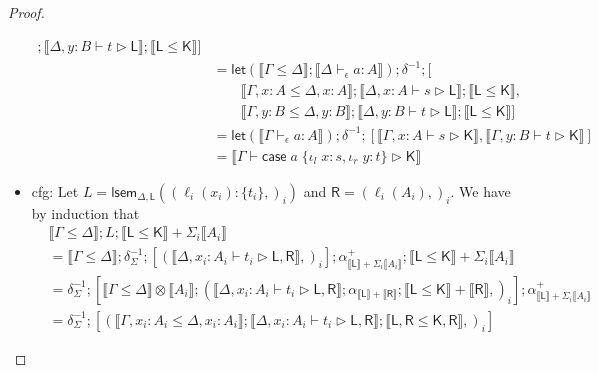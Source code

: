 \documentclass[acmsmall,screen,review]{acmart}
\newcommand{\ms}[1]{\ensuremath{\mathsf{#1}}}
\newcommand{\lto}{:}
\newcommand{\linl}[1]{\iota_l\;{#1}}
\newcommand{\linr}[1]{\iota_r\;{#1}}
\newcommand{\caseexpr}[5]{\ms{case}\;#1\;\{\linl{#2} \lto #3, \linr{#4} \lto #5\}}
\newcommand{\wbranch}[3]{#1(#2) \lto \{#3\}}
\newcommand{\bhyp}[2]{#1 : #2}
\newcommand{\hasty}[4]{#1 \vdash_{#2} #3: {#4}}
\newcommand{\haslb}[3]{#1 \vdash #2 \rhd #3}
\newcommand{\brle}[1]{{\textsf{#1}}}
\newcommand{\dnt}[1]{\llbracket{#1}\rrbracket}
\newcommand{\loopmor}[3]{\ms{lsem}_{#1, #3}(#2)}
\newcommand{\lmor}[1]{\ms{let}(#1)}
\begin{document}
\begin{proof}
\begin{itemize}
\begin{equation}
\begin{aligned}
               ; \dnt{\haslb{\Delta, \bhyp{y}{B}}{t}{\ms{L}}}
               ; \dnt{\ms{L} \leq \ms{K}}
          ] \\
        & = \lmor{\dnt{\Gamma \leq \Delta} ; \dnt{\hasty{\Delta}{\epsilon}{a}{A}}}
           ; \delta^{-1}
           ; [ \\ & \qquad 
              \dnt{\Gamma, \bhyp{x}{A} \leq \Delta, \bhyp{x}{A}}
                ; \dnt{\haslb{\Delta, \bhyp{x}{A}}{s}{\ms{L}}}
                ; \dnt{\ms{L} \leq \ms{K}}, \\ & \qquad
              \dnt{\Gamma, \bhyp{y}{B} \leq \Delta, \bhyp{y}{B}}
                ; \dnt{\haslb{\Delta, \bhyp{y}{B}}{t}{\ms{L}}}
                ; \dnt{\ms{L} \leq \ms{K}}
           ]
            \\
        & = \lmor{\dnt{\hasty{\Gamma}{\epsilon}{a}{A}}}
          ; \delta^{-1}
          ; [ 
            \dnt{\haslb{\Gamma, \bhyp{x}{A}}{s}{\ms{K}}},
            \dnt{\haslb{\Gamma, \bhyp{y}{B}}{t}{\ms{K}}}
          ] \\
        & = \dnt{\haslb{\Gamma}{\caseexpr{a}{x}{s}{y}{t}}{\ms{K}}}
      \end{aligned}
    \end{equation}
    \item \brle{cfg}: Let $L = \loopmor{\Delta}{(\wbranch{\ell_i}{x_i}{t_i},)_i}{\ms{L}}$ and
    $\ms{R} = (\ell_i(A_i),)_i$. We have by induction that
    \begin{equation}
      \begin{aligned}
        & \dnt{\Gamma \leq \Delta} ; L ; \dnt{\ms{L} \leq \ms{K}} + \Sigma_i\dnt{A_i} \\
        & = \dnt{\Gamma \leq \Delta} 
          ; \delta^{-1}_{\Sigma}
          ; [(\dnt{\haslb{\Delta, \bhyp{x_i}{A_i}}{t_i}{\ms{L}, \ms{R}}},)_i]
          ; \alpha^+_{\dnt{\ms{L}} + \Sigma_i\dnt{A_i}}
          ; \dnt{\ms{L} \leq \ms{K}} + \Sigma_i\dnt{A_i} \\
        & = \delta^{-1}_{\Sigma}
          ; [
            \dnt{\Gamma \leq \Delta} \otimes \dnt{A_i}
            ; (\dnt{\haslb{\Delta, \bhyp{x_i}{A_i}}{t_i}{\ms{L}, \ms{R}}}
            ; \alpha_{\dnt{\ms{L}} + \dnt{\ms{R}}}
            ; \dnt{\ms{L} \leq \ms{K}} + \dnt{\ms{R}},)_i]
          ; \alpha^+_{\dnt{\ms{L}} + \Sigma_i\dnt{A_i}} \\
        & = \delta^{-1}_{\Sigma}
          ; [
            (\dnt{\Gamma, \bhyp{x_i}{A_i} \leq \Delta, \bhyp{x_i}{A_i}}
            ; \dnt{\haslb{\Delta, \bhyp{x_i}{A_i}}{t_i}{\ms{L}, \ms{R}}}
            ; \dnt{\ms{L}, \ms{R} \leq \ms{K}, \ms{R}},)_i]

\end{aligned}
\end{equation}
\end{itemize}
\end{proof}
\end{document}
